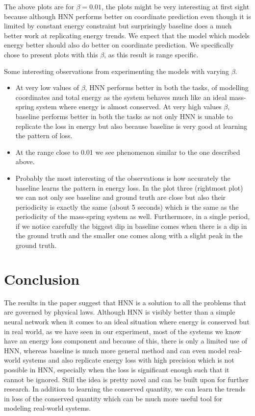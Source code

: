 The above plots are for \(\beta = 0.01\), the plots might be very interesting at first sight because although HNN performs better on coordinate prediction even though it is limited by constant energy constraint but surprisingly baseline does a much better work at replicating energy trends. We expect that the model which models energy better should also do better on coordinate prediction. We specifically chose to present plots with this \(\beta\), as this result is range specific.

Some interesting observations from experimenting the models with varying \(\beta\).
\begin{itemize}
  \item At very low values of \(\beta\), HNN performs better in both the tasks, of modelling coordinates and total energy as the system behaves much like an ideal mass-spring system where energy is almost conserved. At very high values \(\beta\), baseline performs  better in both the tasks as not only HNN is unable to replicate the loss in energy but also because baseline is very good at learning the pattern of loss.
  \item At the range close to 0.01 we see phenomenon similar to the one described above.
  \item Probably the most interesting of the observations is how accurately the baseline learns the pattern in energy loss. In the plot three (rightmost plot) we can not only see baseline and ground truth are close but also their periodicity is exactly the same (about 5 seconds) which is the same as the periodicity of the mass-spring system as well. Furthermore, in a single period, if we notice carefully the biggest dip in baseline comes when there is a dip in the ground truth and the smaller one comes along with a slight peak in the ground truth.
\end{itemize}

\section{Conclusion}
The results in the paper suggest that HNN is a solution to all the problems that are governed by physical laws. Although HNN is visibly better than a simple neural network when it comes to an ideal situation where energy is conserved but in real world, as we have seen in our experiment, most of the systems we know have an energy loss component and because of this, there is only a limited use of HNN, whereas baseline is much more general method and can even model real-world systems and also replicate energy loss with high precision which is not possible in HNN, especially when the loss is significant enough such that it cannot be ignored. Still the idea is pretty novel and can be built upon for further research. In addition to learning the conserved quantity, we can learn the trends in loss of the conserved quantity which can be much more useful tool for modeling real-world systems.
